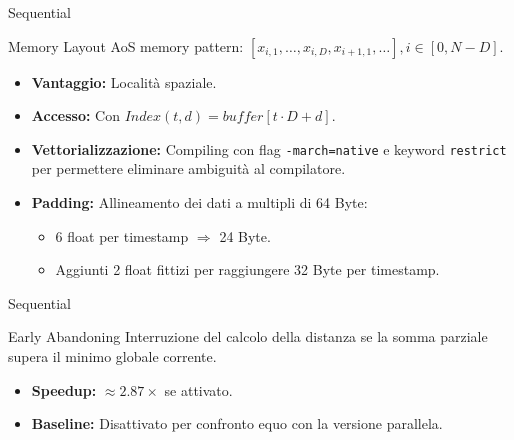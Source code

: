 \begin{frame}{Sequential}
    \begin{block}{Memory Layout}
        AoS memory pattern: $[x_{i,1}, \dots, x_{i,D}, x_{i+1,1}, \dots], i\in[0, N-D]$.
        \begin{itemize}
            \item \textbf{Vantaggio:} Località spaziale.
            \item \textbf{Accesso:} Con $Index(t,d) = buffer[t\cdot D + d]$.
            \item \textbf{Vettorializzazione:} Compiling con flag \texttt{-march=native} e keyword \texttt{restrict} per permettere eliminare ambiguità al compilatore.
            \item \textbf{Padding:} Allineamento dei dati a multipli di 64 Byte:
            \begin{itemize}
                \item 6 float per timestamp $\Rightarrow$ 24 Byte.
                \item Aggiunti 2 float fittizi per raggiungere 32 Byte per timestamp.
            \end{itemize}
        \end{itemize}
    \end{block}
\end{frame}

\begin{frame}{Sequential}
    \begin{block}{Early Abandoning}
        Interruzione del calcolo della distanza se la somma parziale supera il minimo globale corrente.
        \begin{itemize}
            \item \textbf{Speedup:} $\approx 2.87\times$ se attivato.
            \item \textbf{Baseline:} Disattivato per confronto equo con la versione parallela.
        \end{itemize}
    \end{block}
\end{frame}